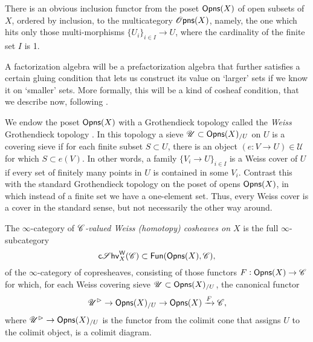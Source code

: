\documentclass[../text.tex]{subfiles}
\begin{document}
\begin{remark}\label{rem:op_to_op}
    There is an obvious inclusion functor from the poset $\opens[r](X)$ of open subsets of $X$, ordered by inclusion, to the multicategory $\opens[s](X)$, namely, the one which hits only those multi-morphisms $\{U_i\}_{i \in I} \rightarrow U$, where the cardinality of the finite set $I$ is 1.
\end{remark}


A factorization algebra will be a prefactorization algebra that further satisfies a certain gluing condition that lets us construct its value on `larger' sets if we know it on `smaller' sets. More formally, this will be a kind of cosheaf condition, that we describe now, following \cite{weiss1999,af_primer}.

We endow the poset $\opens[r](X)$ with a Grothendieck topology called the \emph{Weiss} Grothendieck topology \cite{weiss1999}. In this topology a sieve $\mathscr{U} \subset \opens[r](X)_{/U}$ on $U$ is a covering sieve if for each finite subset $S \subset U$, there is an object $(e: V \rightarrow U) \in \mathscr{U}$ for which $S \subset e(V)$. In other words, a family $\{ V_i \rightarrow U\}_{i \in I}$ is a Weiss cover of $U$ if every set of finitely many points in $U$ is contained in some $V_i$. Contrast this with the standard Grothendieck topology on the poset of opens $\opens[r](X)$, in which instead of a finite set we have a one-element set. Thus, every Weiss cover is a cover in the standard sense, but not necessarily the other way around.

\begin{definition}
    The $\infty$-category of \emph{$\mathscr{C}$-valued Weiss (homotopy) cosheaves on $X$} is the full $\infty$-subcategory
    \begin{equation}
        \csheaves[W]_{X}(\catC) \subset \mathsf{Fun}(\opens[r](X), \catC),
    \end{equation}
    of the $\infty$-category of copresheaves, consisting of those functors $F: \opens[r](X) \rightarrow \catC$ for which, for each Weiss covering sieve $\mathscr{U} \subset \opens[r](X)_{/U}$, the canonical functor
    \begin{equation}
        \mathscr{U}^{\vartriangleright} \rightarrow \opens[r](X)_{/U} \rightarrow \opens[r](X) \xrightarrow{F} \catC,
    \end{equation}
    where $\mathscr{U}^{\vartriangleright} \rightarrow \opens[r](X)_{/U}$ is the functor from the colimit cone that assigns $U$ to the colimit object, is a colimit diagram.
\end{definition}
\end{document}
